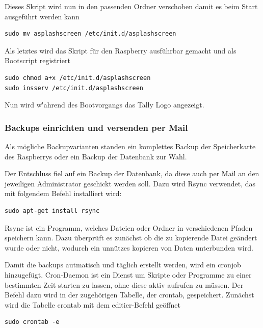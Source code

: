 \documentclass[11pt,a4paper]{article} %
\begin{document}
Dieses Skript wird nun in den passenden Ordner verschoben damit es beim Start ausgeführt werden kann
\begin{frame}

\begin{lstlisting}
sudo mv asplashscreen /etc/init.d/asplashscreen
\end{lstlisting}
\end{frame}

Als letztes wird das Skript für den Raspberry ausführbar gemacht und als Bootscript registriert
\begin{frame}

\begin{lstlisting}
sudo chmod a+x /etc/init.d/asplashscreen
sudo insserv /etc/init.d/asplashscreen
\end{lstlisting}
\end{frame}

Nun wird w\''ahrend des Bootvorgangs das Tally Logo angezeigt.
\newpage

\subsubsection{Backups einrichten und versenden per Mail}
Als m\"ogliche Backupvarianten standen ein komplettes Backup der Speicherkarte des Raspberrys oder ein Backup der Datenbank zur Wahl.
\par
Der Entschluss fiel auf ein Backup der Datenbank, da diese auch per Mail an den jeweiligen Administrator geschickt werden soll. Dazu wird Rsync verwendet, das mit folgendem Befehl installiert wird:
\begin{frame}

\begin{lstlisting}
sudo apt-get install rsync
\end{lstlisting}
\end{frame}
 Rsync ist ein Programm, welches Dateien oder Ordner in verschiedenen Pfaden speichern kann. Dazu überprüft es zunächst ob die zu kopierende Datei geändert wurde oder nicht, wodurch ein unnützes kopieren von Daten unterbunden wird.
\par
Damit die backups autmatisch und täglich erstellt werden, wird ein cronjob hinzugefügt. Cron-Daemon ist ein Dienst um Skripte oder Programme zu einer bestimmten Zeit starten zu lassen, ohne diese aktiv aufrufen zu müssen. Der Befehl dazu wird in der zugehörigen Tabelle, der crontab, gespeichert. Zunächst wird die Tabelle crontab mit dem editier-Befehl geöffnet
\begin{frame}

\begin{lstlisting}
sudo crontab -e
\end{lstlisting}
\end{frame}
\end{document}
